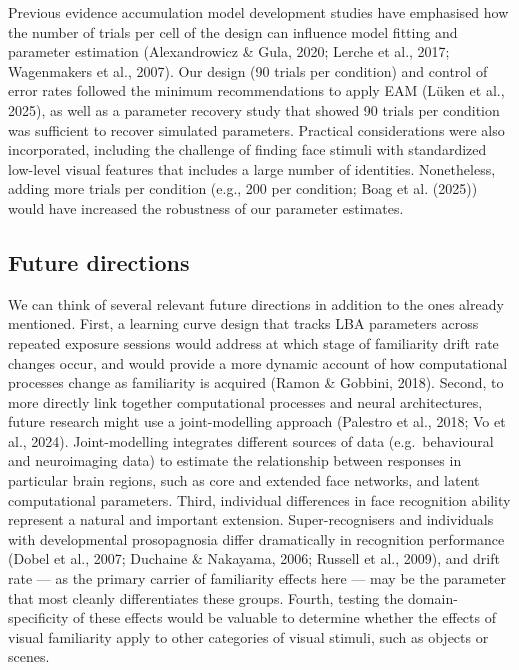 \documentclass[
  letterpaper,
  DIV=11,
  numbers=noendperiod]{scrartcl}
\begin{document}
Previous evidence accumulation model development studies have emphasised
how the number of trials per cell of the design can influence model
fitting and parameter estimation (Alexandrowicz \& Gula, 2020; Lerche et
al., 2017; Wagenmakers et al., 2007). Our design (90 trials per
condition) and control of error rates followed the minimum
recommendations to apply EAM (Lüken et al., 2025), as well as a
parameter recovery study that showed 90 trials per condition was
sufficient to recover simulated parameters. Practical considerations
were also incorporated, including the challenge of finding face stimuli
with standardized low-level visual features that includes a large number
of identities. Nonetheless, adding more trials per condition (e.g., 200
per condition; {Boag et al.} (2025)) would have increased the robustness
of our parameter estimates.

\subsection{Future directions}\label{future-directions}

We can think of several relevant future directions in addition to the
ones already mentioned. First, a learning curve design that tracks LBA
parameters across repeated exposure sessions would address at which
stage of familiarity drift rate changes occur, and would provide a more
dynamic account of how computational processes change as familiarity is
acquired (Ramon \& Gobbini, 2018). Second, to more directly link
together computational processes and neural architectures, future
research might use a joint-modelling approach (Palestro et al., 2018; Vo
et al., 2024). Joint-modelling integrates different sources of data
(e.g.~behavioural and neuroimaging data) to estimate the relationship
between responses in particular brain regions, such as core and extended
face networks, and latent computational parameters. Third, individual
differences in face recognition ability represent a natural and
important extension. Super-recognisers and individuals with
developmental prosopagnosia differ dramatically in recognition
performance (Dobel et al., 2007; Duchaine \& Nakayama, 2006; Russell et
al., 2009), and drift rate --- as the primary carrier of familiarity
effects here --- may be the parameter that most cleanly differentiates
these groups. Fourth, testing the domain-specificity of these effects
would be valuable to determine whether the effects of visual familiarity
apply to other categories of visual stimuli, such as objects or scenes.
\end{document}
